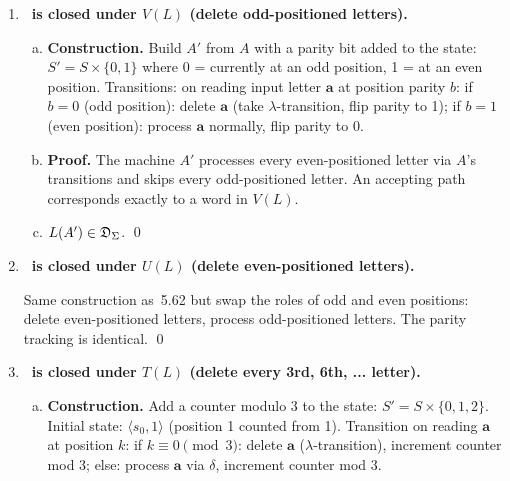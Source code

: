 \begin{enumerate}[{5.}1. ]
\begin{enumerate}[(a)]
  \item \textbf{Proof.}  A word $z$ is in $W(L)$ iff $z$ can be obtained by deleting at least one letter from some $w\in L$.  A path in $A'$ simulates a path in $A$ but uses $\lambda$-transitions to skip letters; the flag ensures at least one skip. Hence $L(A')=W(L)$.

  \item Since $A'$ is a $\lambda$-NDFA, $W(L)\in\DSIG$. \qed
\end{enumerate}

\item \textbf{\DSIG\ is closed under $V(L)$ (delete odd-positioned letters).}

\begin{enumerate}[(a)]
  \item \textbf{Construction.}  Build $A'$ from $A$ with a parity bit added to the state: $S'=S\times\{0,1\}$ where 0 = currently at an odd position, 1 = at an even position.  Transitions: on reading input letter $\pmb{a}$ at position parity $b$:
  if $b=0$ (odd position): delete $\pmb{a}$ (take $\lambda$-transition, flip parity to 1);
  if $b=1$ (even position): process $\pmb{a}$ normally, flip parity to 0.

  \item \textbf{Proof.}  The machine $A'$ processes every even-positioned letter via $A$'s transitions and skips every odd-positioned letter.  An accepting path corresponds exactly to a word in $V(L)$.

  \item $L(A')\in\mathfrak{D}_\Sigma$. \qed
\end{enumerate}

\item \textbf{\DSIG\ is closed under $U(L)$ (delete even-positioned letters).}

Same construction as~5.62 but swap the roles of odd and even positions: delete even-positioned letters, process odd-positioned letters.  The parity tracking is identical. \qed

\item \textbf{\DSIG\ is closed under $T(L)$ (delete every 3rd, 6th, ... letter).}

\begin{enumerate}[(a)]
  \item \textbf{Construction.}  Add a counter modulo 3 to the state: $S'=S\times\{0,1,2\}$.  Initial state: $\langle s_0,1\rangle$ (position 1 counted from 1).  Transition on reading $\pmb{a}$ at position $k$:
  if $k\equiv 0\pmod{3}$: delete $\pmb{a}$ ($\lambda$-transition), increment counter mod 3;
  else: process $\pmb{a}$ via $\delta$, increment counter mod 3.


\end{enumerate}
\end{enumerate}
